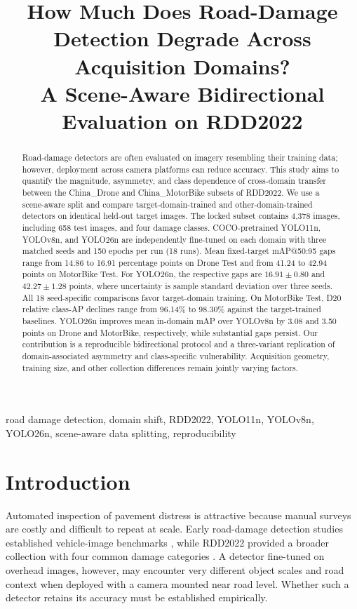 \documentclass[conference,a4paper]{IEEEtran}
\title{How Much Does Road-Damage Detection Degrade Across Acquisition Domains?\\A Scene-Aware Bidirectional Evaluation on RDD2022}
\author{\IEEEauthorblockN{Lê Thành Luân\IEEEauthorrefmark{1}, Phạm Bá Anh Tuấn\IEEEauthorrefmark{2}}\IEEEauthorblockA{University of Science and Technology -- The University of Danang, Da Nang, Vietnam\\\IEEEauthorrefmark{1}102250416@hv.dut.udn.vn; \IEEEauthorrefmark{2}102250421@hv.dut.udn.vn}}
\begin{document}
\maketitle
\begin{abstract}
Road-damage detectors are often evaluated on imagery resembling their training data; however, deployment across camera platforms can reduce accuracy. This study aims to quantify the magnitude, asymmetry, and class dependence of cross-domain transfer between the China\_Drone and China\_MotorBike subsets of RDD2022. We use a scene-aware split and compare target-domain-trained and other-domain-trained detectors on identical held-out target images. The locked subset contains 4,378 images, including 658 test images, and four damage classes. COCO-pretrained YOLO11n, YOLOv8n, and YOLO26n are independently fine-tuned on each domain with three matched seeds and 150 epochs per run (18 runs). Mean fixed-target mAP@50:95 gaps range from 14.86 to 16.91 percentage points on Drone Test and from 41.24 to 42.94 points on MotorBike Test. For YOLO26n, the respective gaps are $16.91\pm0.80$ and $42.27\pm1.28$ points, where uncertainty is sample standard deviation over three seeds. All 18 seed-specific comparisons favor target-domain training. On MotorBike Test, D20 relative class-AP declines range from 96.14\% to 98.30\% against the target-trained baselines. YOLO26n improves mean in-domain mAP over YOLOv8n by 3.08 and 3.50 points on Drone and MotorBike, respectively, while substantial gaps persist. Our contribution is a reproducible bidirectional protocol and a three-variant replication of domain-associated asymmetry and class-specific vulnerability. Acquisition geometry, training size, and other collection differences remain jointly varying factors.
\end{abstract}
\begin{IEEEkeywords}
road damage detection, domain shift, RDD2022, YOLO11n, YOLOv8n, YOLO26n, scene-aware data splitting, reproducibility
\end{IEEEkeywords}
\section{Introduction}
Automated inspection of pavement distress is attractive because manual surveys are costly and difficult to repeat at scale. Early road-damage detection studies established vehicle-image benchmarks \cite{maeda2018road}, while RDD2022 provided a broader collection with four common damage categories \cite{arya2024rdd2022}. A detector fine-tuned on overhead images, however, may encounter very different object scales and road context when deployed with a camera mounted near road level. Whether such a detector retains its accuracy must be established empirically.
\end{document}
